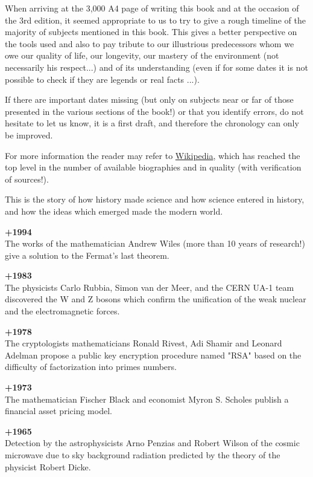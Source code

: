 When arriving at the 3,000 A4 page of writing this book and at the occasion of the 3rd edition, it seemed appropriate to us to try to give a rough timeline of the majority of subjects mentioned in this book. This gives a better perspective on the tools used and also to pay tribute to our illustrious predecessors whom we owe our quality of life, our longevity, our mastery of the environment (not necessarily his respect...) and of its understanding (even if for some dates it is not possible to check if they are legends or real facts ...).

If there are important dates missing (but only on subjects near or far of those presented in the various sections of the book!) or that you identify errors, do not hesitate to let us know, it is a first draft, and therefore the chronology can only be improved.

For more information the reader may refer to \href{http://www.wikipedia.com}{{\color{blue} Wikipedia}}, which has reached the top level in the number of available biographies and in quality (with verification of sources!).

This is the story of how history made science and how science entered in history, and how the ideas which emerged made the modern world.

\textbf{+1994}\\
The works of the mathematician Andrew Wiles (more than 10 years of research!) give a solution to the Fermat's last theorem.

\textbf{+1983}\\
The physicists Carlo Rubbia, Simon van der Meer, and the CERN UA-1 team discovered the W and Z bosons which confirm the unification of the weak nuclear and the electromagnetic forces.

\textbf{+1978}\\
The cryptologists mathematicians Ronald Rivest, Adi Shamir and Leonard Adelman propose a public key encryption procedure named "RSA" based on the difficulty of factorization into primes numbers.

\textbf{+1973}\\
The mathematician Fischer Black and economist Myron S. Scholes publish a financial asset pricing model.

\textbf{+1965}\\
Detection by the astrophysicists Arno Penzias and Robert Wilson of the cosmic microwave due to sky background radiation predicted by the theory of the physicist Robert Dicke. 

